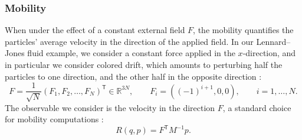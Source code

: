 \documentclass[11pt]{article}
\newcommand{\R}{\mathbb{R}}
\renewcommand{\t}{\mathsf T}
\theoremstyle{definition}
\begin{document}
\subsubsection{Mobility}
\label{subsubsec:mobility_num}
When under the effect of a constant external field $F$, the mobility quantifies the particles' average velocity in the direction of the applied field. In our Lennard--Jones fluid example, we consider a constant force applied in the $x$-direction, and in particular we consider colored drift, which amounts to perturbing half the particles to one direction, and the other half in the opposite direction \cite{evans2007}:
\begin{equation}
	F = \frac{1}{\sqrt{N}}(F_1,F_2,\dotsc,F_N)^\t \in \R^{3N}, \qquad F_i = ((-1)^{i+1}, 0, 0), \qquad i = 1,\dotsc,N.
\end{equation}
The observable we consider is the velocity in the direction $F$, a standard choice for mobility computations \cite[Section 5.2.2]{lelievre2016}:
\begin{equation}
	R(q,p) = F^\t M^{-1}p.
\end{equation}
\end{document}
